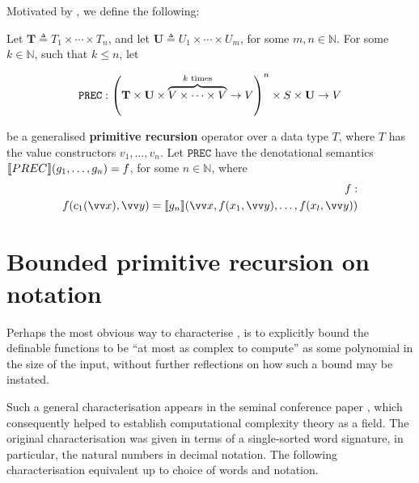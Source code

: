Motivated by \cite{leivant-1995}, we define the following:

\begin{definition} Let $\mathbf{T} \triangleq T_1 \times \cdots \times T_n$,
and let $\mathbf{U} \triangleq U_1 \times \cdots \times U_m$, for some $m, n
\in \mathbb{N}$. For some $k \in \mathbb{N}$, such that $k\leq n$, let

$$\mathtt{PREC} : {\mathopen{}\left({\mathbf{T} \times \mathbf{U} \times \overbrace{V \times
\cdots \times V}^{\text{$k$ times}} \rightarrow V}\right)\mathclose{}}^n \times S \times \mathbf{U}
\rightarrow V$$

be a generalised \textbf{primitive recursion} operator over a data type $T$,
where $T$ has the value constructors $v_1,\ldots,v_n$. Let $\mathtt{PREC}$ have
the denotational semantics ${\mathopen{}\left\llbracket{PREC}\right\rrbracket\mathclose{}}{\mathopen{}\left({g_1,\ldots,g_n}\right)\mathclose{}} = f$, for some $n \in
\mathbb{N}$, where\begin{align*}
%
f : \\
%
f\p{c_1\p{\vect{x}},\vect{y}} = \sem{g_n}\p{\vect{x}, f\p{x_1,
\vect{y}},\ldots, f\p{x_l, \vect{y}}}
%
\end{align*}

\end{definition}

\section{Bounded primitive recursion on notation}

Perhaps the most obvious way to characterise \FPTIME{}, is to explicitly bound
the definable functions to be ``at most as complex to compute'' as some
polynomial in the size of the input, without further reflections on how such a
bound may be instated.

Such a general characterisation appears in the seminal conference paper
\cite{cobham-1965}, which consequently helped to establish computational
complexity theory as a field\cite{clote-1999}. The original characterisation
was given in terms of a single-sorted word signature, in particular, the
natural numbers in decimal notation. The following characterisation equivalent
up to choice of words and notation. 

\def\smashf{\ensuremath{\mathtt{\#}}}
\def\cdotnot{\ensuremath{\cdot}}

